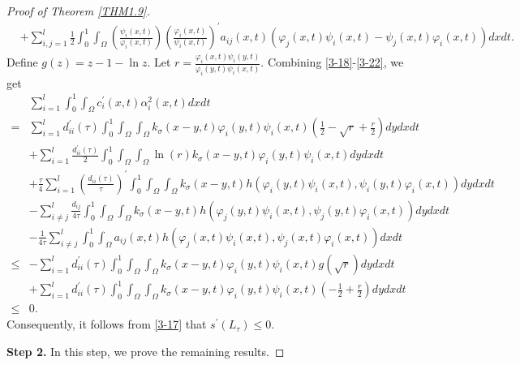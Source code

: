 \documentclass[11pt,reqno]{amsart}
\numberwithin{equation}{section}
\begin{document}
\begin{proof}[Proof of Theorem \ref{THM1.9}]
\begin{equation}
\begin{aligned}
&+ \sum_{i,j=1}^{l}\frac{1}{2}\int_{0}^{1}  \int_{\Omega} \left( \frac{\psi_{i}(x,t)}{\varphi_{i}(x,t)} \right) \left( \frac{\varphi_{i}(x,t)}{\psi_{i}(x,t)} \right)^{\prime} a_{ij}(x,t) \left( \varphi_{j}(x,t)\psi_{i}(x,t) - \psi_{j}(x,t)\varphi_{i}(x,t) \right)dx dt.
\end{aligned}
\end{equation}
Define $g(z)=z - 1 - \ln z$. Let
$r= \frac{\varphi_{i}(x,t)\psi_{i}(y,t)}{\varphi_{i}(y,t)\psi_{i}(x,t) }  $.
Combining \eqref{3-18}-\eqref{3-22}, we get
%
%
\begin{align} \label{3-23}
&\sum_{i=1}^{l} \int_{0}^{1}\int_{\Omega}c_{i}^{\prime}(x,t)\alpha_{i}^{2}(x,t)dxdt
\\ \nonumber
=&\sum_{i=1}^{l} d_{ii}^{\prime}(\tau)\int_{0}^{1}\int_{\Omega}  \int_{\Omega} k_{\sigma}(x-y,t)\varphi_{i}(y,t)\psi_{i}(x,t)   \left( \frac{1}{2} - \sqrt{r} + \frac{r}{2} \right) dydxdt
\\ \nonumber
&+ \sum_{i = 1}^{l} \frac{d_{ii}^{\prime}(\tau)}{2} \int_{0}^{1}\int_{\Omega}\int_{\Omega} \ln \left( r \right)k_{\sigma}(x-y,t)\varphi_{i}(y,t)\psi_{i}(x,t)dydxdt
\\ \nonumber
&+ \frac{\tau}{4} \sum_{i=1}^{l}\left( \frac{d_{ii}(\tau)}{\tau} \right)^{\prime}\int_{0}^{1}  \int_{\Omega} \int_{\Omega} k_{\sigma}(x-y,t) h(\varphi_{i}(y,t)\psi_{i}(x,t),\psi_{i}(y,t)\varphi_{i}(x,t) )dydxdt
\\ \nonumber
&-\sum_{i\neq j}^{l}\frac{d_{ij}}{4 \tau}  \int_{0}^{1}  \int_{\Omega} \int_{\Omega}
k_{\sigma}(x-y,t) h(\varphi_{j}(y,t)\psi_{i}(x,t),\psi_{j}(y,t)\varphi_{i}(x,t))dydxdt
\\ \nonumber
&- \frac{1}{4\tau} \sum_{i\neq j}^{l} \int_{0}^{1}  \int_{\Omega} a_{ij}(x,t) h(\varphi_{j}(x,t)\psi_{i}(x,t),\psi_{j}(x,t)\varphi_{i}(x,t)) dxdt
\\ \nonumber
\leq& -\sum_{i=1}^{l} d_{ii}^{\prime}(\tau) \int_{0}^{1}\int_{\Omega}\int_{\Omega}  k_{\sigma}(x-y,t) \varphi_{i}(y,t)\psi_{i}(x,t) g\left( \sqrt{ r } \right)dydxdt
\\ \nonumber
&+ \sum_{i=1}^{l} d_{ii}^{\prime}(\tau) \int_{0}^{1}\int_{\Omega}\int_{\Omega}  k_{\sigma}(x-y,t) \varphi_{i}(y,t)\psi_{i}(x,t) \left( -\frac{1}{2} + \frac{r}{2} \right)dydxdt \\\nonumber
\leq& 0.
\end{align}
Consequently, it follows from \eqref{3-17} that $s^{\prime}(L_{\tau}) \leq 0$.


\textbf{Step 2.}
In this step, we prove the remaining results.


\end{proof}
\end{document}
